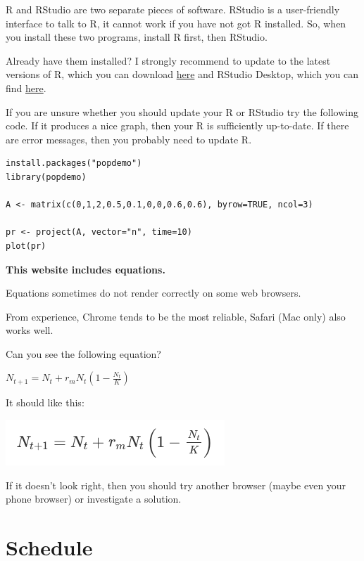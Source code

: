 \documentclass[
  a4paper]{book}
\begin{document}
R and RStudio are two separate pieces of software. RStudio is a user-friendly interface to talk to R, it cannot work if you have not got R installed. So, when you install these two programs, install R first, then RStudio.

Already have them installed? I strongly recommend to update to the latest versions of R, which you can download \href{https://cran.r-project.org}{here} and RStudio Desktop, which you can find \href{https://www.rstudio.com/products/rstudio/}{here}.

If you are unsure whether you should update your R or RStudio try the following code. If it produces a nice graph, then your R is sufficiently up-to-date. If there are error messages, then you probably need to update R.

\begin{verbatim}
install.packages("popdemo")
library(popdemo)

A <- matrix(c(0,1,2,0.5,0.1,0,0,0.6,0.6), byrow=TRUE, ncol=3)

pr <- project(A, vector="n", time=10)
plot(pr)
\end{verbatim}

\begin{do-something}
\textbf{This website includes equations. }

Equations sometimes do not render correctly on some web browsers.

From experience, Chrome tends to be the most reliable, Safari (Mac only)
also works well.

Can you see the following equation?

\(N_{t+1}=N_{t}+r_{m} N_{t}\left(1-\frac{N_{t}}{K}\right)\)

It should like this:

\includegraphics{testEquation.png}

If it doesn't look right, then you should try another browser (maybe
even your phone browser) or investigate a solution.
\end{do-something}

\hypertarget{schedule}{%
\chapter{Schedule}\label{schedule}}
\end{document}
